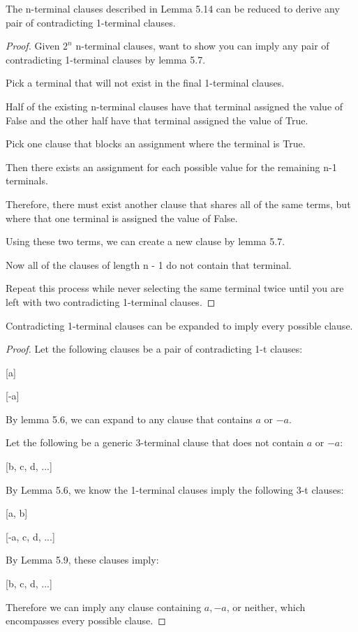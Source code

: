 \documentclass[manuscript]{acmart}
\begin{document}
    \begin{lemma}
        The n-terminal clauses described in Lemma 5.14 can be reduced to derive
        any pair of contradicting 1-terminal clauses.
    \end{lemma}
    \begin{proof}
        Given $2^n$ n-terminal clauses, want to show you can imply any pair
        of contradicting 1-terminal clauses by lemma 5.7.

        Pick a terminal that will not exist in the final 1-terminal clauses.

        Half of the existing n-terminal clauses have that terminal assigned
        the value of False and the other half have that terminal assigned
        the value of True.

        Pick one clause that blocks an assignment where the terminal is True.

        Then there exists an assignment for each possible
        value for the remaining n-1 terminals.

        Therefore, there must exist another clause that shares all of the same terms, but
        where that one terminal is assigned the value of False.

        Using these two terms, we can create a new clause by lemma 5.7.

        Now all of the clauses of length n - 1 do not contain that terminal.

        Repeat this process while never selecting the same terminal twice
        until you are left with two contradicting 1-terminal clauses.
    \end{proof}

    \begin{lemma}
        Contradicting 1-terminal clauses can be expanded to imply
        every possible clause.
    \end{lemma}
    \begin{proof}
        Let the following clauses be a pair of contradicting 1-t clauses:

        [a]

        [-a]

        By lemma 5.6, we can expand to any clause that contains $a$ or $-a$.

        Let the following be a generic 3-terminal clause that does not contain
        $a$ or $-a$:

        [b, c, d, ...]

        By Lemma 5.6, we know the 1-terminal clauses imply the following 3-t clauses:

        [a, b]

        [-a, c, d, ...]

        By Lemma 5.9, these clauses imply:

        [b, c, d, ...]

        Therefore we can imply any clause containing $a, -a$, or neither, 
        which encompasses every possible clause.
    \end{proof}
\end{document}
